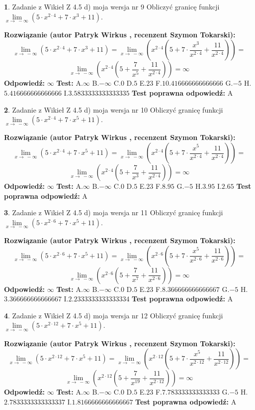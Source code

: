 \documentclass[12pt, a4paper]{article}
\theoremstyle{definition} %
\newtheorem{zad}{}
\newcommand{\zadStart}[1]{\begin{zad}#1\newline}
\newcommand{\zadStop}{\end{zad}}
\newcommand{\rozwStart}[2]{\noindent \textbf{Rozwiązanie (autor #1 , recenzent #2): }\newline}
\newcommand{\rozwStop}{\newline}
\newcommand{\odpStart}{\noindent \textbf{Odpowiedź:}\newline}
\newcommand{\odpStop}{\newline}
\newcommand{\testStart}{\noindent \textbf{Test:}\newline}
\newcommand{\testStop}{\newline}
\newcommand{\kluczStart}{\noindent \textbf{Test poprawna odpowiedź:}\newline}
\newcommand{\kluczStop}{\newline}
\begin{document}
\zadStart{Zadanie z Wikieł Z 4.5 d) moja wersja nr 9}
Obliczyć granicę funkcji  $\lim\limits_{x\to\ -\infty}(5 \cdot x^{2\cdot4}+7 \cdot x^{3}+11)$.
\zadStop
\rozwStart{Patryk Wirkus}{Szymon Tokarski}
$$\lim\limits_{x\to\ -\infty}(5 \cdot x^{2\cdot4}+7 \cdot x^{3}+11) = \lim\limits_{x\to\ -\infty}(x^{2\cdot4}(5 +7 \cdot \frac{x^{3}}{x^{2\cdot4}}+\frac{11}{x^{2\cdot4}})) =$$ $$\lim\limits_{x\to\ -\infty}(x^{2\cdot4}(5 +\frac{7}{x^{5}}+\frac{11}{x^{2\cdot4}})) =\infty$$
\rozwStop
\odpStart
$\infty$
\odpStop
\testStart
A.$\infty$ B.$-\infty$ C.$0$ D.$5$ E.$23$
F.$10.416666666666666$ G.$-5$
H.$5.416666666666666$
I.$3.5833333333333335$
\testStop
\kluczStart
A
\kluczStop



\zadStart{Zadanie z Wikieł Z 4.5 d) moja wersja nr 10}
Obliczyć granicę funkcji  $\lim\limits_{x\to\ -\infty}(5 \cdot x^{2\cdot4}+7 \cdot x^{5}+11)$.
\zadStop
\rozwStart{Patryk Wirkus}{Szymon Tokarski}
$$\lim\limits_{x\to\ -\infty}(5 \cdot x^{2\cdot4}+7 \cdot x^{5}+11) = \lim\limits_{x\to\ -\infty}(x^{2\cdot4}(5 +7 \cdot \frac{x^{5}}{x^{2\cdot4}}+\frac{11}{x^{2\cdot4}})) =$$ $$\lim\limits_{x\to\ -\infty}(x^{2\cdot4}(5 +\frac{7}{x^{3}}+\frac{11}{x^{2\cdot4}})) =\infty$$
\rozwStop
\odpStart
$\infty$
\odpStop
\testStart
A.$\infty$ B.$-\infty$ C.$0$ D.$5$ E.$23$
F.$8.95$ G.$-5$
H.$3.95$
I.$2.65$
\testStop
\kluczStart
A
\kluczStop



\zadStart{Zadanie z Wikieł Z 4.5 d) moja wersja nr 11}
Obliczyć granicę funkcji  $\lim\limits_{x\to\ -\infty}(5 \cdot x^{2\cdot6}+7 \cdot x^{5}+11)$.
\zadStop
\rozwStart{Patryk Wirkus}{Szymon Tokarski}
$$\lim\limits_{x\to\ -\infty}(5 \cdot x^{2\cdot6}+7 \cdot x^{5}+11) = \lim\limits_{x\to\ -\infty}(x^{2\cdot6}(5 +7 \cdot \frac{x^{5}}{x^{2\cdot6}}+\frac{11}{x^{2\cdot6}})) =$$ $$\lim\limits_{x\to\ -\infty}(x^{2\cdot6}(5 +\frac{7}{x^{7}}+\frac{11}{x^{2\cdot6}})) =\infty$$
\rozwStop
\odpStart
$\infty$
\odpStop
\testStart
A.$\infty$ B.$-\infty$ C.$0$ D.$5$ E.$23$
F.$8.366666666666667$ G.$-5$
H.$3.366666666666667$
I.$2.2333333333333334$
\testStop
\kluczStart
A
\kluczStop



\zadStart{Zadanie z Wikieł Z 4.5 d) moja wersja nr 12}
Obliczyć granicę funkcji  $\lim\limits_{x\to\ -\infty}(5 \cdot x^{2\cdot12}+7 \cdot x^{5}+11)$.
\zadStop
\rozwStart{Patryk Wirkus}{Szymon Tokarski}
$$\lim\limits_{x\to\ -\infty}(5 \cdot x^{2\cdot12}+7 \cdot x^{5}+11) = \lim\limits_{x\to\ -\infty}(x^{2\cdot12}(5 +7 \cdot \frac{x^{5}}{x^{2\cdot12}}+\frac{11}{x^{2\cdot12}})) =$$ $$\lim\limits_{x\to\ -\infty}(x^{2\cdot12}(5 +\frac{7}{x^{19}}+\frac{11}{x^{2\cdot12}})) =\infty$$
\rozwStop
\odpStart
$\infty$
\odpStop
\testStart
A.$\infty$ B.$-\infty$ C.$0$ D.$5$ E.$23$
F.$7.783333333333333$ G.$-5$
H.$2.7833333333333337$
I.$1.8166666666666667$
\testStop
\kluczStart
A
\kluczStop
\end{document}
